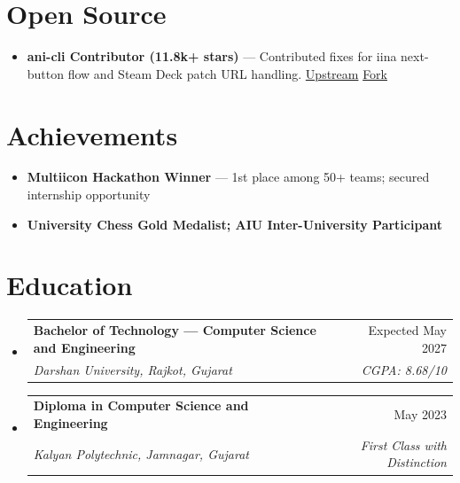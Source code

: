 \documentclass[11pt,a4paper]{article}
\makeatletter
\newcommand{\resumeSubheading}[4]{
  \vspace{-1pt}\item
    \begin{tabular*}{0.97\textwidth}[t]{l@{\extracolsep{\fill}}r}
      \textbf{#1} & #2 \\
      \textit{#3} & \textit{#4} \\
    \end{tabular*}\vspace{-3pt}
}
\newcommand{\resumeItem}[1]{
  \item\small{#1 \vspace{-1pt}}
}
\makeatother
\begin{document}
\section{Open Source}
\begin{itemize}[leftmargin=*]
  \resumeItem{\textbf{ani-cli Contributor (11.8k+ stars)} --- Contributed fixes for iina next-button flow and Steam Deck patch URL handling. \href{https://github.com/pystardust/ani-cli}{Upstream} \textbar{} \href{https://github.com/Dhairya3391/ani-cli}{Fork}}
\end{itemize}

\section{Achievements}
\begin{itemize}[leftmargin=*]
  \resumeItem{\textbf{Multiicon Hackathon Winner} --- 1st place among 50+ teams; secured internship opportunity}
  \resumeItem{\textbf{University Chess Gold Medalist; AIU Inter-University Participant}}
\end{itemize}

\section{Education}
\begin{itemize}[leftmargin=*]

\resumeSubheading
{Bachelor of Technology --- Computer Science and Engineering}{Expected May 2027}
{Darshan University, Rajkot, Gujarat}{CGPA: 8.68/10}

\resumeSubheading
{Diploma in Computer Science and Engineering}{May 2023}
{Kalyan Polytechnic, Jamnagar, Gujarat}{First Class with Distinction}

\end{itemize}
\end{document}
